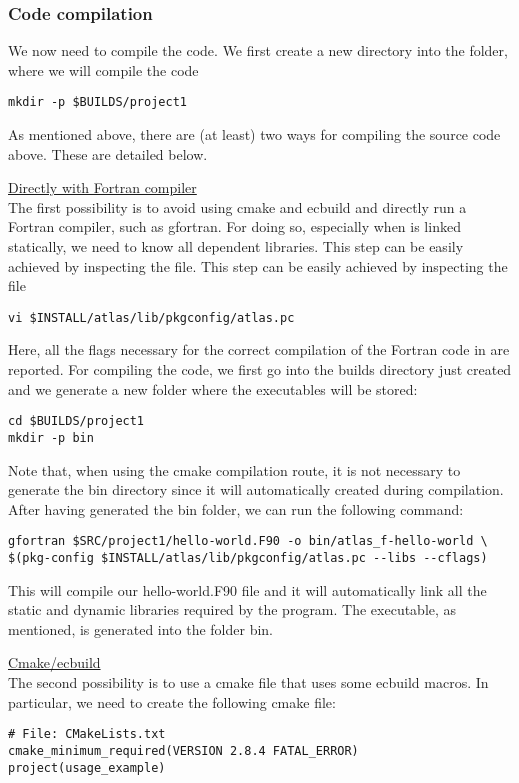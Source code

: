 \subsubsection*{Code compilation}
We now need to compile the code. We first create a new directory
into the  folder, where we will compile the code
%
\begin{lstlisting}[style=BashStyle]
mkdir -p $BUILDS/project1
\end{lstlisting}
%
As mentioned above, there are (at least) two ways for compiling 
the source code above. These are detailed below.
%
\begin{description}
%
\item \underline{Directly with Fortran compiler}\\[0.5em]
%
The first possibility is to avoid using cmake and ecbuild and 
directly run a Fortran compiler, such as gfortran.
For doing so, especially when \Atlas is linked statically,
we need to know all \Atlas dependent libraries. This step can be easily
achieved by inspecting the file. This step can be easily achieved by inspecting 
the file 
%
\begin{lstlisting}[style=BashStyle]
vi $INSTALL/atlas/lib/pkgconfig/atlas.pc
\end{lstlisting}
%
Here, all the flags necessary for the correct compilation 
of the Fortran code in  are reported. For 
compiling the code, we first go into the builds directory 
just created and we generate a new folder where the executables 
will be stored: 
%
\begin{lstlisting}[style=BashStyle]
cd $BUILDS/project1
mkdir -p bin
\end{lstlisting}
%
Note that, when using the cmake compilation route, it is not 
necessary to generate the bin directory since it will automatically 
created during compilation.
After having generated the bin folder, we can run the following 
command:
%
\begin{lstlisting}[style=BashStyle]
gfortran $SRC/project1/hello-world.F90 -o bin/atlas_f-hello-world \ 
$(pkg-config $INSTALL/atlas/lib/pkgconfig/atlas.pc --libs --cflags)
\end{lstlisting}
%
This will compile our hello-world.F90 file and it will automatically 
link all the static and dynamic libraries required by the program. 
The executable, as mentioned, is generated into the folder bin.
%
\item \underline{Cmake/ecbuild}\\[0.5em]
%
The second possibility is to use a cmake file that uses some 
ecbuild macros. In particular, we need to create the following 
cmake file:
%
\begin{lstlisting}[style=XMLStyle]
# File: CMakeLists.txt
cmake_minimum_required(VERSION 2.8.4 FATAL_ERROR)
project(usage_example)


\end{lstlisting}
\end{description}
